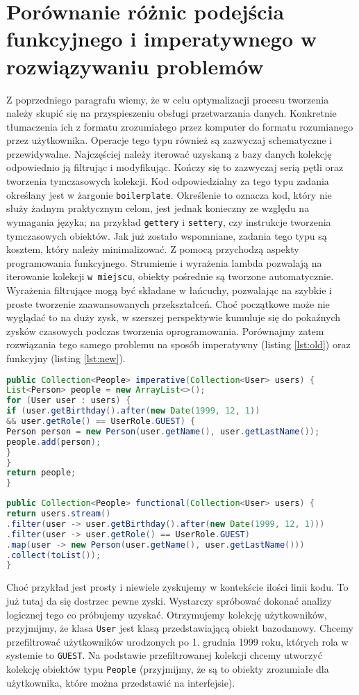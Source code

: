 \documentclass[a4paper,10pt]{report}
\begin{document}
\section{Porównanie różnic podejścia funkcyjnego i imperatywnego w rozwiązywaniu problemów}
Z poprzedniego paragrafu wiemy, że w celu optymalizacji procesu tworzenia należy skupić się na przyspieszeniu obsługi przetwarzania danych. Konkretnie tłumaczenia ich z formatu zrozumiałego przez komputer do formatu rozumianego przez użytkownika. Operacje tego typu również są zazwyczaj schematyczne i przewidywalne. Najczęściej należy iterować uzyskaną z bazy danych kolekcję odpowiednio ją filtrując i modyfikując. Kończy się to zazwyczaj serią pętli oraz tworzenia tymczasowych kolekcji. Kod odpowiedzialny za tego typu zadania określany jest w żargonie \verb|boilerplate|. Określenie to oznacza kod, który nie służy żadnym praktycznym celom, jest jednak konieczny ze względu na wymagania języka; na przykład \verb|gettery| i \verb|settery|, czy instrukcje tworzenia tymczasowych obiektów. Jak już zostało wspomniane, zadania tego typu są kosztem, który należy minimalizować. Z pomocą przychodzą aspekty programowania funkcyjnego. Strumienie i wyrażenia lambda pozwalają na iterowanie kolekcji \verb|w miejscu|, obiekty pośrednie są tworzone automatycznie. Wyrażenia filtrujące mogą być składane w łańcuchy, pozwalając na szybkie i proste tworzenie zaawansowanych przekształceń. Choć początkowe może nie wyglądać to na duży zysk, w szerszej perspektywie kumuluje się do pokaźnych zysków czasowych podczas tworzenia oprogramowania. Porównajmy zatem rozwiązania tego samego problemu na sposób imperatywny (listing \ref{lst:old}) oraz funkcyjny (listing \ref{lst:new}).
\begin{lstlisting}[caption={Podejście imperatywne},label={lst:old},language=Java]
public Collection<People> imperative(Collection<User> users) {
List<Person> people = new ArrayList<>();
for (User user : users) {
if (user.getBirthday().after(new Date(1999, 12, 1))
&& user.getRole() == UserRole.GUEST) {
Person person = new Person(user.getName(), user.getLastName());
people.add(person);
}
}
return people;
}
\end{lstlisting}
\begin{lstlisting}[caption={Podejście funkcyjne},label={lst:new},language=Java]
public Collection<People> functional(Collection<User> users) {
return users.stream()
.filter(user -> user.getBirthday().after(new Date(1999, 12, 1)))
.filter(user -> user.getRole() == UserRole.GUEST)
.map(user -> new Person(user.getName(), user.getLastName()))
.collect(toList());
}
\end{lstlisting}
Choć przykład jest prosty i niewiele zyskujemy w kontekście ilości linii kodu. To już tutaj da się dostrzec pewne zyski. Wystarczy spróbować dokonać analizy logicznej tego co próbujemy uzyskać. Otrzymujemy kolekcję użytkowników, przyjmijmy, że klasa \verb|User| jest klasą przedstawiającą obiekt bazodanowy. Chcemy przefiltrować użytkowników urodzonych po 1. grudnia 1999 roku, których rola w systemie to \verb|GUEST|. Na podstawie przefiltrowanej kolekcji chcemy utworzyć kolekcję obiektów typu \verb|People| (przyjmijmy, że są to obiekty zrozumiałe dla użytkownika, które można przedstawić na interfejsie).
\end{document}
